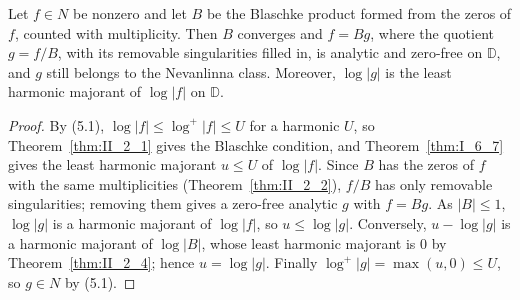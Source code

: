 \begin{lemma}
  \label{lem:II_5_2}
  \leanok
  \mainline
  Let $f\in N$ be nonzero and let $B$ be the Blaschke product formed from the
  zeros of $f$, counted with multiplicity. Then $B$ converges and $f=Bg$, where
  the quotient $g=f/B$, with its removable singularities filled in, is analytic
  and zero-free on $\mathbb{D}$, and $g$ still belongs to the Nevanlinna class.
  Moreover, $\log|g|$ is the least harmonic majorant of $\log|f|$ on
  $\mathbb{D}$.
  \begin{proof}
    \leanok
    By (5.1), $\log|f|\le\log^+|f|\le U$ for a harmonic $U$, so
    Theorem~\ref{thm:II_2_1} gives the Blaschke condition, and
    Theorem~\ref{thm:I_6_7} gives the least harmonic majorant $u\le U$ of
    $\log|f|$. Since $B$ has the zeros of $f$ with the same multiplicities
    (Theorem~\ref{thm:II_2_2}), $f/B$ has only removable singularities;
    removing them gives a zero-free analytic $g$ with $f=Bg$. As $|B|\le1$,
    $\log|g|$ is a harmonic majorant of $\log|f|$, so $u\le\log|g|$.
    Conversely, $u-\log|g|$ is a harmonic majorant of $\log|B|$, whose least
    harmonic majorant is $0$ by Theorem~\ref{thm:II_2_4}; hence
    $u=\log|g|$. Finally $\log^+|g|=\max(u,0)\le U$, so $g\in N$ by (5.1).
  \end{proof}
\end{lemma}

